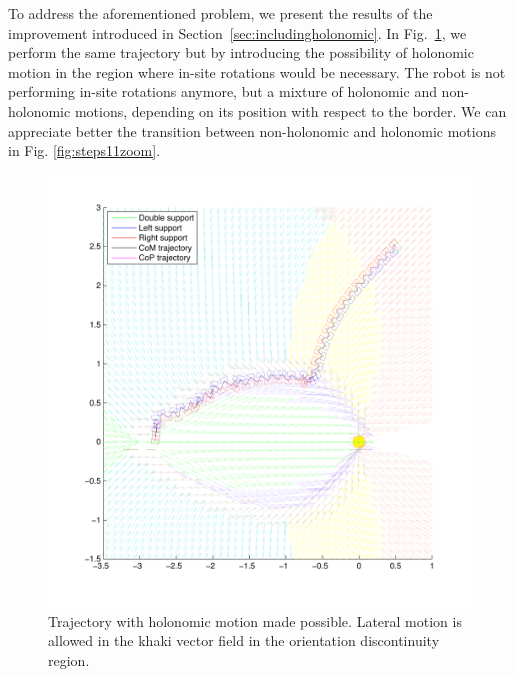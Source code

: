 To address the aforementioned problem, we present the results of the improvement introduced in Section~\ref{sec:includingholonomic}. In Fig.~\ref{fig:steps11}, we perform the same trajectory but by introducing the possibility of holonomic motion in the region where in-site rotations would be necessary. The robot is not performing in-site rotations anymore, but a mixture of holonomic and non-holonomic motions, depending on its position with respect to the border. We can appreciate better the transition between non-holonomic and holonomic motions in Fig. \ref{fig:steps11zoom}. %

\begin{figure}[ht]
\centering
\includegraphics[scale=0.8  ]{Chap5-Visual-Planning/steps11.pdf}
\caption{Trajectory with holonomic motion made possible. Lateral motion is allowed in the khaki vector field in the orientation discontinuity region.}
\label{fig:steps11}
\end{figure}


